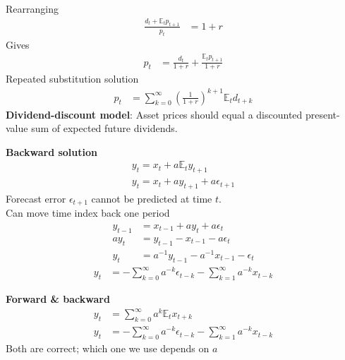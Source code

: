 \documentclass{beamer}
\begin{document}
\begin{frame}
 Rearranging 
 \begin{align}  
  \frac{d_t + \mathbb{E}_tp_{t+1}}{p_t}&=1+r  
\end{align}
Gives
\begin{align}
  p_t&= \frac{d_t}{1+r} + \frac{\mathbb{E}_tp_{t+1}}{1+r}
\end{align}
Repeated substitution solution
\begin{align}
 p_t&= \sum^{\infty}_{k=0}\left(\frac{1}{1+r}\right)^{k+1}\mathbb{E}_td_{t+k}     
\end{align}
\medskip
 \textbf{Dividend-discount model}: Asset prices should equal a discounted present-value sum of expected future dividends.
\end{frame}

\begin{frame}
  \textbf{Backward solution}  
 \begin{align}
    y_t=x_t + a\mathbb{E}_ty_{t+1} \\ \nonumber
    y_t= x_t + ay_{t+1} + a\epsilon_{t+1}
 \end{align}
  Forecast error $\epsilon_{t+1}$ cannot be predicted at time $t$.\\
  Can move time index back one period
  \begin{align}
  y_{t-1} &= x_{t-1} + ay_t + a\epsilon_t\\ \nonumber
  ay_t &= y_{t-1} - x_{t-1} - a\epsilon_t\\ \nonumber
  y_t &= a^{-1}y_{t-1} - a^{-1}x_{t-1} - \epsilon_t 
\end{align}
\begin{align}
  y_t&= -\sum^{\infty}_{k=0}a^{-k}\epsilon_{t-k}-\sum^{\infty}_{k=1}a^{-k}x_{t-k}
\end{align}
\end{frame}

\begin{frame}
  \textbf{Forward \& backward}
  \begin{align*}
    y_t &= \sum^\infty_{k=0}a^k\mathbb{E}_tx_{t+k} \\
    y_t&= -\sum^{\infty}_{k=0}a^{-k}\epsilon_{t-k}-\sum^{\infty}_{k=1}a^{-k}x_{t-k}
  \end{align*}
  \medskip
  Both are correct; which one we use depends on $a$  
\end{frame}
\end{document}
